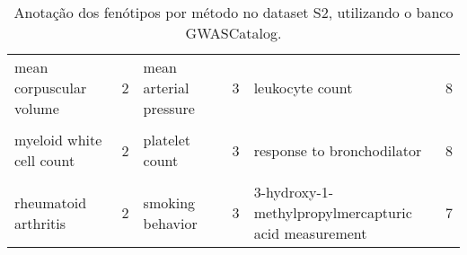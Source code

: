 \begin{table}[!htbp]
{\begin{tabular}[t]{lrlrlr}
mean corpuscular volume & 2 & mean arterial pressure & 3 & leukocyte count & 8\\
\cellcolor{gray!6}{metabolic syndrome} & \cellcolor{gray!6}{2} & \cellcolor{gray!6}{obsessive-compulsive disorder} & \cellcolor{gray!6}{3} & \cellcolor{gray!6}{lymphocyte count} & \cellcolor{gray!6}{8}\\
myeloid white cell count & 2 & platelet count & 3 & response to bronchodilator & 8\\
\cellcolor{gray!6}{myocardial infarction} & \cellcolor{gray!6}{2} & \cellcolor{gray!6}{prostate carcinoma} & \cellcolor{gray!6}{3} & \cellcolor{gray!6}{triglyceride measurement} & \cellcolor{gray!6}{8}\\
rheumatoid arthritis & 2 & smoking behavior & 3 & \makecell[l]{3-hydroxy-1-methylpropylmercapturic\\acid measurement} & 7\\
\bottomrule
\end{tabular}}

\caption{Anotação dos fenótipos por método no dataset S2, utilizando o banco GWASCatalog.}
\label{tab:ds2_gwas_persnp_annot}

\end{table}
